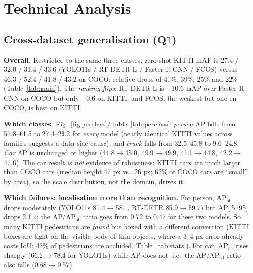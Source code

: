 \documentclass[10pt]{article}
\newcommand{\tb}[1]{\resizebox{\linewidth}{!}{#1}}
\begin{document}
\begin{table}[h]\centering\footnotesize
\caption{Per-class AP (\%) on COCO val vs.\ the KITTI subset, same three classes.}\label{tab:perclass}
\tb{}
\end{table}

\begin{table}[h]\centering\footnotesize
\caption{Latency, memory and size (controlled benchmark, batch 1, conf 0.25; median of 3 interleaved rounds; round-to-round spread is $\le$12\% for torchvision/RT-DETR and up to $\sim$35\% for the small YOLO models).}\label{tab:latency}
\tb{}
\end{table}

\section{Technical Analysis}
\subsection{Cross-dataset generalisation (Q1)}
\textbf{Overall.} Restricted to the same three classes, zero-shot KITTI mAP is 27.4 / 32.0 / 31.4 / 33.6 (YOLO11s / RT-DETR-L / Faster R-CNN / FCOS) versus 46.3 / 52.4 / 41.8 / 43.2 on COCO: relative drops of 41\%, 39\%, 25\% and 22\% (Table~\ref{tab:main}). The \emph{ranking flips}: RT-DETR-L is $+10.6$ mAP over Faster R-CNN on COCO but only $+0.6$ on KITTI, and FCOS, the weakest-but-one on COCO, is best on KITTI.

\textbf{Which classes.} Fig.~\ref{fig:perclass}/Table~\ref{tab:perclass}: \emph{person} AP falls from 51.8--61.5 to 27.4--29.2 for \emph{every} model (nearly identical KITTI values across families suggests a data-side cause), and \emph{truck} falls from 32.5--45.8 to 9.6--24.8. \emph{Car} AP is unchanged or higher (44.8$\rightarrow$45.0, 49.9$\rightarrow$49.9, 41.1$\rightarrow$44.8, 42.2$\rightarrow$47.6). The car result is \emph{not} evidence of robustness: KITTI cars are much larger than COCO cars (median height 47 px vs.\ 26 px; 62\% of COCO cars are ``small'' by area), so the scale distribution, not the domain, drives it.

\textbf{Which failures: localisation more than recognition.} For person, AP$_{50}$ drops moderately (YOLO11s 81.4$\rightarrow$58.1, RT-DETR 85.9$\rightarrow$59.7) but AP[.5:.95] drops 2.1$\times$; the AP/AP$_{50}$ ratio goes from 0.72 to 0.47 for these two models. So many KITTI pedestrians are \emph{found} but boxed with a different convention (KITTI boxes are tight on the visible body of thin objects, where a 3--4 px error already costs IoU; 43\% of pedestrians are occluded, Table~\ref{tab:stats}). For car, AP$_{50}$ rises sharply (66.2$\rightarrow$78.4 for YOLO11s) while AP does not, i.e.\ the AP/AP$_{50}$ ratio also falls (0.68$\rightarrow$0.57).
\end{document}
